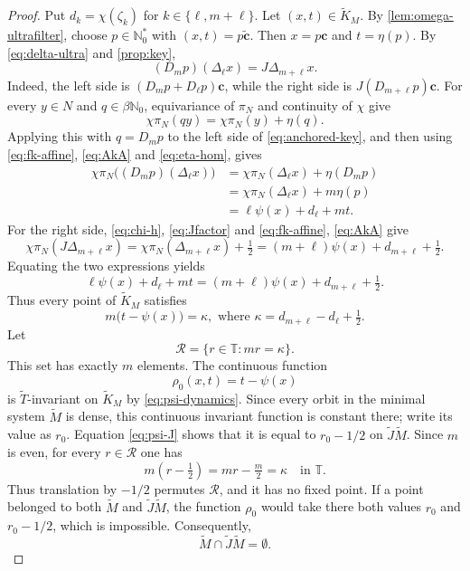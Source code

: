 \documentclass[reqno,12pt]{amsart}
\newcommand{\Nzero}{\mathbb N_0}
\newcommand{\Nstar}{\Nzero^{*}}
\newcommand{\Torus}{\mathbb T}
\numberwithin{equation}{section}
\begin{document}
\begin{proof}
Put $d_k=\chi(\zeta_k)$ for $k\in\{\ell,m+\ell\}$. Let
$(x,t)\in\widetilde K_M$. By \cref{lem:omega-ultrafilter}, choose $p\in\Nstar$ with
$(x,t)=p\widetilde{\mathbf c}$. Then $x=p\mathbf c$ and $t=\eta(p)$. By
\eqref{eq:delta-ultra} and \cref{prop:key},
\begin{equation}\label{eq:anchored-key}
 (D_m p)(\Delta_\ell x)=J\Delta_{m+\ell}x.
\end{equation}
Indeed, the left side is
$(D_mp+D_\ell p)\mathbf c$, while the right side is
$J(D_{m+\ell}p)\mathbf c$.
For every $y\in N$ and $q\in\beta\Nzero$, equivariance of $\pi_N$ and
continuity of $\chi$ give
\[
 \chi\pi_N(qy)=\chi\pi_N(y)+\eta(q).
\]
Applying this with $q=D_m p$ to the left side of
\eqref{eq:anchored-key}, and then using \eqref{eq:fk-affine}, \eqref{eq:AkA} and \eqref{eq:eta-hom}, gives
\[
 \begin{aligned}
 \chi\pi_N\bigl((D_m p)(\Delta_\ell x)\bigr)
 &=\chi\pi_N(\Delta_\ell x)+\eta(D_m p)\\
 &=\chi\pi_N(\Delta_\ell x)+m\eta(p)\\
 &=\ell\psi(x)+d_\ell+mt.
 \end{aligned}
\]
For the right side, \eqref{eq:chi-h}, \eqref{eq:Jfactor} and \eqref{eq:fk-affine}, \eqref{eq:AkA} give
\[
 \chi\pi_N(J\Delta_{m+\ell}x)
 =\chi\pi_N(\Delta_{m+\ell}x)+\tfrac12
 =(m+\ell)\psi(x)+d_{m+\ell}+\tfrac12.
\]
Equating the two expressions yields
\[
 \ell\psi(x)+d_\ell+mt
 =(m+\ell)\psi(x)+d_{m+\ell}+\tfrac12.
\]
Thus every point of $\widetilde K_M$ satisfies
\begin{equation}\label{eq:finite-root}
 m\bigl(t-\psi(x)\bigr)=\kappa, \text{ where }
 \kappa=d_{m+\ell}-d_\ell+\tfrac12.
\end{equation}
Let
\[
 \mathcal R=\{r\in\Torus:mr=\kappa\}.
\]
This set has exactly $m$ elements. The continuous function
\[
 \rho_0(x,t)=t-\psi(x)
\]
is $\widetilde T$-invariant on $\widetilde K_M$ by
\eqref{eq:psi-dynamics}. Since every orbit in the minimal system
$\widetilde M$ is dense, this continuous invariant function is constant there;
write its value as $r_0$. Equation \eqref{eq:psi-J} shows that it is equal to
$r_0-1/2$ on $\widetilde J\widetilde M$. Since $m$ is even, for every $r\in\mathcal R$ one has
\[
 m(r-\tfrac12)=mr-\tfrac m2=\kappa\quad\text{in }\Torus.
\]
Thus translation by $-1/2$ permutes $\mathcal R$, and it has no fixed point.
If a point belonged to both $\widetilde M$ and
$\widetilde J\widetilde M$, the function $\rho_0$ would take there both
values $r_0$ and $r_0-1/2$, which is impossible. Consequently,
\begin{equation}\label{eq:lifted-disjoint}
 \widetilde M\cap\widetilde J\widetilde M=\emptyset.
\end{equation}


\end{proof}
\end{document}
